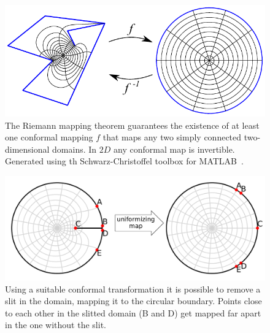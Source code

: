 \begin{figure}
\begin{center}
    \includegraphics[scale=1.0]{chapters/ch4-sle/figs/scmap}
\end{center}
\caption{The Riemann mapping theorem guarantees the existence of at least one
    conformal mapping $f$ that maps any two simply connected two-dimensional
    domains. In $2D$ any conformal map is invertible. Generated using th
    Schwarz-Christoffel toolbox for MATLAB~\cite{Driscoll2005}.}
\label{fig:scmap}
\end{figure}


\begin{figure}
\begin{center}
    \includegraphics[width=\textwidth]{chapters/ch4-sle/figs/diskfix}
\end{center}
\caption{Using a suitable conformal transformation it is possible to remove
    a slit in the domain, mapping it to the circular boundary. Points close
    to each other in the slitted domain (B and D) get mapped far apart in
    the one without the slit.}
\label{fig:diskfix}
\end{figure}


